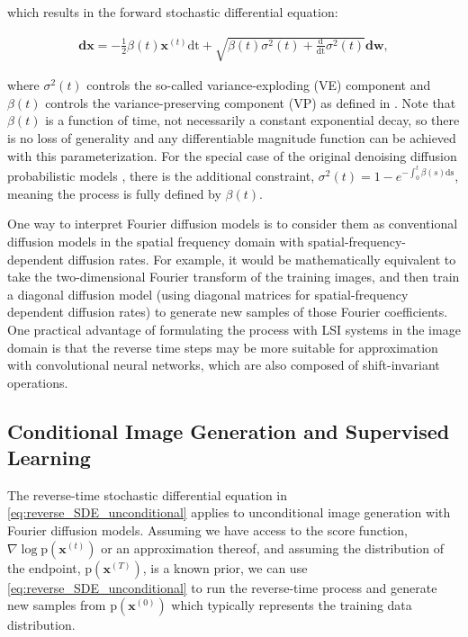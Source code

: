 \documentclass[12pt,]{article}
\begin{document}
\noindent which results in the forward stochastic differential equation:

\begin{gather}
    \mathbf{dx} = -\frac{1}{2} \beta(t) \mathbf{x}^{(t)}\text{dt} + \sqrt{\beta(t)\sigma^2(t) + \frac{\text{d}}{\text{dt}}\sigma^2(t)}\mathbf{dw} ,
    \label{eq:white_noise}
\end{gather}

\noindent where $\sigma^2(t)$ controls the so-called variance-exploding (VE) component and $\beta(t)$ controls the variance-preserving component (VP) as defined in \cite{song2020score}. Note that $\beta(t)$ is a function of time, not necessarily a constant exponential decay, so there is no loss of generality and any differentiable magnitude function can be achieved with this parameterization. For the special case of the original denoising diffusion probabilistic models \cite{sohl2015deep} \cite{ho2020denoising}, there is the additional constraint, $\sigma^2(t) = 1 - e^{-\int_0^{t}\beta(s)\text{ds}}$, meaning the process is fully defined by $\beta(t)$. 

One way to interpret Fourier diffusion models is to consider them as conventional diffusion models in the spatial frequency domain with spatial-frequency-dependent diffusion rates. For example, it would be mathematically equivalent to take the two-dimensional Fourier transform of the training images, and then train a diagonal diffusion model (using diagonal matrices for spatial-frequency dependent diffusion rates) to generate new samples of those Fourier coefficients. One practical advantage of formulating the process with LSI systems in the image domain is that the reverse time steps may be more suitable for approximation with convolutional neural networks, which are also composed of shift-invariant operations.

\subsection{Conditional Image Generation and Supervised Learning}

The reverse-time stochastic differential equation in \eqref{eq:reverse_SDE_unconditional} applies to unconditional image generation with Fourier diffusion models. Assuming we have access to the score function, $\nabla \log{\text{p} (\mathbf{x}^{(t)})}$ or an approximation thereof, and  assuming the distribution of the endpoint, $\text{p}(\mathbf{x}^{(T)})$, is a known prior, we can use \eqref{eq:reverse_SDE_unconditional} to run the reverse-time process and generate new samples from $\text{p}(\mathbf{x}^{(0)})$ which typically represents the training data distribution. 
\end{document}
